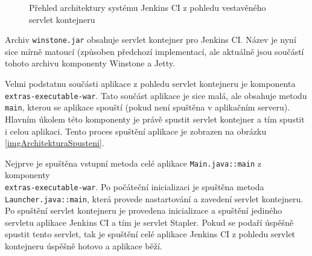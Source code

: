             \begin{figure}[ht]
                \begin{center}
                    \caption{Přehled architektury systému Jenkins CI z pohledu vestavěného servlet kontejneru}
                    \label{imgArchitekturaServlet}
                \end{center}
            \end{figure}

            
            Archiv \texttt{winstone.jar} obsahuje servlet kontejner pro Jenkins CI. Název je nyní sice mírně matoucí
            (způsoben předchozí implementací, ale aktuálně jsou součástí tohoto archivu komponenty Winstone a Jetty.

            Velmi podstatnu součásti aplikace z pohledu servlet kontejneru je komponenta\\\texttt{extras-executable-war}. 
            Tato součást aplikace je sice malá, ale obsahuje metodu \texttt{main}, kterou se aplikace spouští 
            (pokud není spuštěna v aplikačním serveru). Hlavním úkolem této komponenty je právě spustit 
            servlet kontejner a tím spustit i celou aplikaci. Tento proces spuštění aplikace je zobrazen
            na obrázku \ref{imgArchitekturaSpusteni}.

            Nejprve je spuštěna vstupní metoda celé aplikace \texttt{Main.java::main} z komponenty\\\texttt{extras-executable-war}.
            Po počáteční inicializaci je spuštěna metoda \texttt{Launcher.java::main}, která provede nastartování a 
            zavedení servlet kontejneru. Po spuštění servlet kontejneru je provedena inicializace a spuštění
            jediného servletu aplikace Jenkins CI a tím je servlet Stapler. %
            Pokud se podaří úspěšně spustit tento servlet, tak je spuštění celé aplikace Jenkins CI z pohledu
            servlet kontejneru úspěšně hotovo a aplikace běží.

